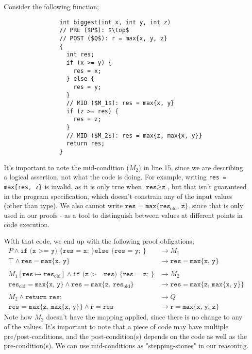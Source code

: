\documentclass[a4paper, 12pt]{article}
\begin{document}
            Consider the following function;
            \begin{lstlisting}
                int biggest(int x, int y, int z)
                // PRE ($P$): $\top$
                // POST ($Q$): r = max{x, y, z}
                {
                  int res;
                  if (x >= y) {
                    res = x;
                  } else {
                    res = y;
                  }
                  // MID ($M_1$): res = max{x, y}
                  if (z >= res) {
                    res = z;
                  }
                  // MID ($M_2$): res = max{z, max{x, y}}
                  return res;
                }
            \end{lstlisting}
            It's important to note the mid-condition ($M_2$) in line 15, since we are describing a logical assertion, not what the code is doing. For example, writing \texttt{res = max\{res, z\}} is invalid, as it is only true when $\texttt{res} \geq \texttt{z}$, but that isn't guaranteed in the program specification, which doesn't constrain any of the input values (other than type). We also cannot write $\texttt{res = max\{}\texttt{res}_\text{old}\texttt{, z\}}$, since that is only used in our proofs - as a tool to distinguish between values at different points in code execution.
            \medskip

            With that code, we end up with the following proof obligations;
            \begin{align*}
                P \land \texttt{if (x >= y) \{ res = x; \} else \{ res = y; \}} & \rightarrow M_1 \\
                \top \land \texttt{res} = \texttt{max\{x, y\}} & \rightarrow \texttt{res} = \texttt{max\{x, y\}} \\ \\
                M_1[\texttt{res} \mapsto \texttt{res}_\text{old}] \land \texttt{if (z >= res) \{ res = z; \}} & \rightarrow M_2 \\
                \texttt{res}_\text{old} = \texttt{max\{x, y\}} \land \texttt{res} = \texttt{max\{z, }\texttt{res}_\text{old}\texttt{\}} & \rightarrow \texttt{res} = \texttt{max\{z, max\{x, y\}\}} \\ \\
                M_2 \land \texttt{return res;} & \rightarrow Q \\
                \texttt{res = max\{z, max\{x, y\}\}} \land \textbf{r} = \texttt{res} & \rightarrow \textbf{r} = \texttt{max\{x, y, z\}}
            \end{align*}
            Note how $M_2$ doesn't have the mapping applied, since there is no change to any of the values. It's important to note that a piece of code may have multiple pre/post-conditions, and the post-condition(s) depends on the code as well as the pre-condition(s). We can use mid-conditions as "stepping-stones" in our reasoning.
\end{document}
